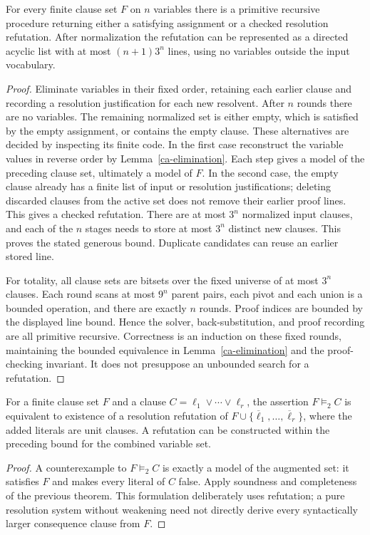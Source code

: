 \begin{theorem}
\label{ca-resolution-complete}
For every finite clause set $F$ on $n$ variables there is a primitive
recursive procedure returning either a satisfying assignment or a checked
resolution refutation.  After normalization the refutation can be represented
as a directed acyclic list with at most $(n+1)3^n$ lines, using no variables
outside the input vocabulary.
\end{theorem}
\begin{proof}
Eliminate variables in their fixed order, retaining each earlier clause and
recording a resolution justification for each new resolvent.  After $n$
rounds there are no variables.  The remaining normalized set is either empty,
which is satisfied by the empty assignment, or contains the empty clause.
These alternatives are decided by inspecting its finite code.
In the first case reconstruct the variable values in reverse order by
Lemma~\ref{ca-elimination}.  Each step gives a model of the preceding clause
set, ultimately a model of $F$.  In the second case, the empty clause already
has a finite list of input or resolution justifications; deleting discarded
clauses from the active set does not remove their earlier proof lines.
This gives a checked refutation.  There are at most $3^n$ normalized input
clauses, and each of the $n$ stages needs to store at most $3^n$ distinct new
clauses.  This proves the stated generous bound.  Duplicate candidates can
reuse an earlier stored line.

For totality, all clause sets are bitsets over the fixed universe of at most
$3^n$ clauses.  Each round scans at most $9^n$ parent pairs, each pivot and
each union is a bounded operation, and there are exactly $n$ rounds.  Proof
indices are bounded by the displayed line bound.  Hence the solver,
back-substitution, and proof recording are all primitive recursive.
Correctness is an induction on these fixed rounds, maintaining the bounded
equivalence in Lemma~\ref{ca-elimination} and the proof-checking invariant.
It does not presuppose an unbounded search for a refutation.
\end{proof}

\begin{corollary}\label{ca-clausal-entail}
For a finite clause set $F$ and a clause
$C=\ell_1\vee\cdots\vee\ell_r$, the assertion $F\models_2 C$ is equivalent
to existence of a resolution refutation of
$F\cup\{\overline\ell_1,\ldots,\overline\ell_r\}$, where the added literals
are unit clauses.  A refutation can be constructed within the preceding
bound for the combined variable set.
\end{corollary}
\begin{proof}
A counterexample to $F\models_2C$ is exactly a model of the augmented set:
it satisfies $F$ and makes every literal of $C$ false.  Apply soundness and
completeness of the previous theorem.  This formulation deliberately uses
refutation; a pure resolution system without weakening need not directly
derive every syntactically larger consequence clause from $F$.
\end{proof}

